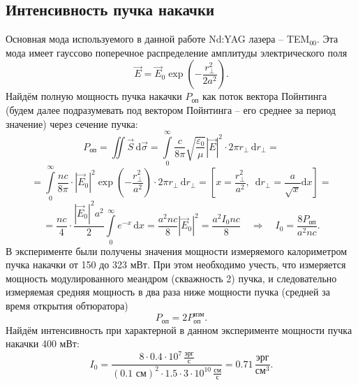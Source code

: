 \documentclass[a4paper,14pt]{extarticle}
\begin{document}
\subsection{Интенсивность пучка накачки}
Основная  мода используемого в данной работе Nd:YAG лазера -- TEM${}_{00}$. Эта мода имеет  гауссово поперечное распределение амплитуды электрического поля
\begin{equation}
	\vec{E}=\vec{E}_{0} \exp\left(-\frac{r^2_\perp}{2 a^2}\right).
\end{equation}
Найдём полную мощность пучка накачки $P_\text{оп}$  как поток вектора Пойнтинга (будем далее подразумевать под вектором Пойнтинга -- его среднее за период значение) через сечение пучка:
\begin{equation}
	P_\text{оп} = \iint \vec{S} \, \mathrm{d}{\vec{\sigma}} = 
	\int\limits_0^\infty \frac{c}{8\pi}\sqrt{\frac{\varepsilon_0}{\mu}}{|\vec{E}|^2}\cdot 2\pi r_\perp \, \mathrm{d}r_\perp=
\end{equation}
\begin{equation}
	=\int\limits_0^\infty \frac{nc}{8\pi}\cdot |\vec{E}_0|^2\exp\left(-\frac{r^2_\perp}{a^2}\right) \cdot 2\pi r_\perp \, \mathrm{d}r_\perp=\left[x=\frac{r^2_\perp}{a^2},\,\,\,\mathrm{d}r_\perp = \frac{a}{\sqrt{x}}\mathrm{d}x\right]=
\end{equation}
\begin{equation}
	=\frac{nc}{4}\cdot\frac{|\vec{E}_0|^2 a^2}{2}\int\limits_0^\infty e^{-x} \, \mathrm{d}x  = \frac{a^2 nc}{8} |\vec{E}_0|^2 = \frac{a^2I_0 nc}{8}
	\quad \Rightarrow \quad I_0 = \frac{8P_\text{оп}}{a^2 nc}.
\end{equation}
В эксперименте были получены значения мощности измеряемого калориметром пучка накачки от 150 до 323 мВт. При этом необходимо учесть, что измеряется мощность модулированного меандром (скважность 2) пучка, и следовательно измеряемая  средняя мощность в два раза ниже мощности пучка (средней за время открытия обтюратора)   
\begin{equation}
	P_\text{оп} = 2P_\text{оп}^\text{изм}.
\end{equation}
Найдём интенсивность при характерной в данном эксперименте мощности пучка накачки 400 мВт:
\begin{equation}
	I_0 = \frac{8\cdot 0.4 \cdot 10^7\, \frac{\text{эрг}}{\text{с}}}{(0.1\text{ см})^2 \cdot 1.5 \cdot 3\cdot 10^{10}  \,\frac{\text{см}}{\text{с}}}=0.71 \,\frac{\text{эрг}}{\text{см}^3}.
\end{equation}
\end{document}
